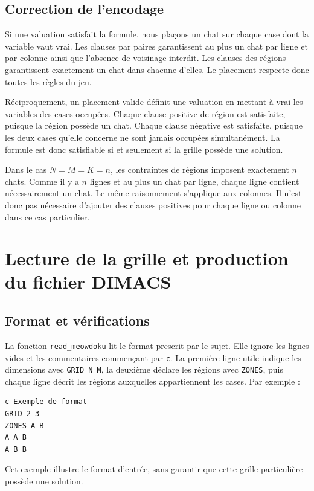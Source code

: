 \documentclass[11pt,a4paper]{article}
\begin{document}
\subsection{Correction de l'encodage}

Si une valuation satisfait la formule, nous plaçons un chat sur chaque
case dont la variable vaut vrai. Les clauses par paires garantissent
au plus un chat par ligne et par colonne ainsi que l'absence de voisinage
interdit. Les clauses des régions garantissent exactement un chat dans
chacune d'elles. Le placement respecte donc toutes les règles du jeu.

Réciproquement, un placement valide définit une valuation en mettant à
vrai les variables des cases occupées. Chaque clause positive de région
est satisfaite, puisque la région possède un chat. Chaque clause négative
est satisfaite, puisque les deux cases qu'elle concerne ne sont jamais
occupées simultanément. La formule est donc satisfiable si et seulement
si la grille possède une solution.

Dans le cas $N=M=K=n$, les contraintes de régions imposent exactement
$n$ chats. Comme il y a $n$ lignes et au plus un chat par ligne, chaque ligne
contient nécessairement un chat. Le même raisonnement s'applique aux
colonnes. Il n'est donc pas nécessaire d'ajouter des clauses positives
pour chaque ligne ou colonne dans ce cas particulier.

\section{Lecture de la grille et production du fichier DIMACS}

\subsection{Format et vérifications}

La fonction \texttt{read\_meowdoku} lit le format prescrit par le sujet.
Elle ignore les lignes vides et les commentaires commençant par
\texttt{c}. La première ligne utile indique les dimensions avec
\texttt{GRID N M}, la deuxième déclare les régions avec \texttt{ZONES},
puis chaque ligne décrit les régions auxquelles appartiennent les cases.
Par exemple :
\begin{lstlisting}
c Exemple de format
GRID 2 3
ZONES A B
A A B
A B B
\end{lstlisting}
Cet exemple illustre le format d'entrée, sans garantir que cette grille
particulière possède une solution.
\end{document}
